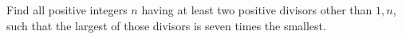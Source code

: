 Find all positive integers $n$ having at least two positive divisors other than $1,n$, such that the largest of those divisors is seven times the smallest.

